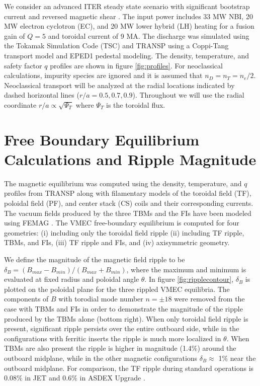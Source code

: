 \documentclass{article}
\numberwithin{figure}{section}
\numberwithin{equation}{section}
\begin{document}
We consider an advanced ITER steady state scenario with significant bootstrap current and reversed magnetic shear \cite{Poli2014}. The input power includes 33 MW NBI, 20 MW electron cyclotron (EC), and 20 MW lower hybrid (LH) heating for a fusion gain of $Q = 5$ and toroidal current of 9 MA. The discharge was simulated using the Tokamak Simulation Code (TSC) \cite{Jardin1986} and TRANSP \cite{Hawryluk1980} using a Coppi-Tang \cite{Jardin1993} transport model and EPED1 \cite{Snyder2011} pedestal modeling. The density, temperature, and safety factor $q$ profiles are shown in figure \ref{fig:profiles}. For neoclassical calculations, impurity species are ignored and it is assumed that $n_D = n_T = n_e/2$. Neoclassical transport will be analyzed at the radial locations indicated by dashed horizontal lines ($r/a = 0.5, 0.7, 0.9$). Throughout we will use the radial coordinate $r/a \propto \sqrt{\Psi_T}$ where $\Psi_T$ is the toroidal flux.

\FloatBarrier

\section{Free Boundary Equilibrium Calculations and Ripple Magnitude} \label{vmec}

The magnetic equilibrium was computed using the density, temperature, and $q$ profiles from TRANSP along with filamentary models of the toroidal field (TF), poloidal field (PF), and center stack (CS) coils and their corresponding currents. The vacuum fields produced by the three TBMs and the FIs have been modeled using FEMAG \cite{Shinohara2009}. The VMEC free-boundary equilibrium \cite{Hirshman1986} is computed for four geometries: (i) including only the toroidal field ripple (ii) including TF ripple, TBMs, and FIs, (iii) TF ripple and FIs, and (iv) axisymmetric geometry.  

We define the magnitude of the magnetic field ripple to be $\delta_B = (B_{max}-B_{min})/(B_{max} + B_{min})$, where the maximum and minimum is evaluated at fixed radius and poloidal angle $\theta$. In figure \ref{fig:ripplecontour}, $\delta_B$ is plotted on the poloidal plane for the three rippled VMEC equilibria. The components of $B$ with torodial mode number $n = \pm 18$ were removed from the case with TBMs and FIs in order to demonstrate the magnitude of the ripple produced by the TBMs alone (bottom right). When only toroidal field ripple is present, significant ripple persists over the entire outboard side, while in the configurations with ferritic inserts the ripple is much more localized in $\theta$. When TBMs are also present the ripple is higher in magnitude (1.4\%) around the outboard midplane, while in the other magnetic configurations $\delta_B \approx$ 1\% near the outboard midplane. For comparison, the TF ripple during standard operations is $0.08\%$ in JET \cite{DeVries2008} and $0.6\%$ in ASDEX Upgrade \cite{Martitsch2016}. 
\end{document}
